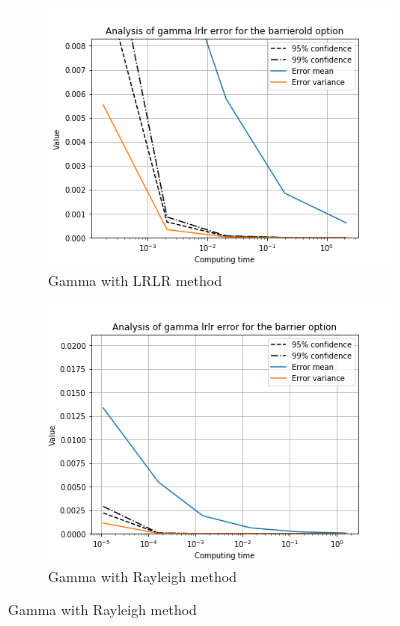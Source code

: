 \documentclass[11pt,a4paper,fleqn]{article}
\begin{document}
\begin{figure}[h!]
      \begin{subfigure}[b]{0.45\textwidth}
          \includegraphics[width=\textwidth]{graphs/barrieroldgammalrlrtime.png}
          \caption{Gamma with LRLR method}
      \end{subfigure}
      \begin{subfigure}[b]{0.45\textwidth}
          \includegraphics[width=\textwidth]{graphs/barriergammalrlrtime.png}
          \caption{Gamma with Rayleigh method}
      \end{subfigure}


\end{figure}
\end{document}
